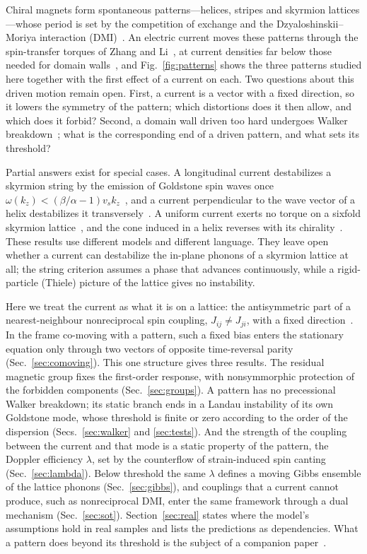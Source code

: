 \documentclass[prb,reprint,amsmath,amssymb,superscriptaddress,floatfix]{revtex4-2}
\begin{document}
Chiral magnets form spontaneous patterns---helices, stripes and skyrmion lattices---whose period is set by the competition of exchange and the Dzyaloshinskii--Moriya interaction (DMI)~\cite{Muhlbauer2009,Nagaosa2013}. An electric current moves these patterns through the spin-transfer torques of Zhang and Li~\cite{ZhangLi2004,Thiaville2005}, at current densities far below those needed for domain walls~\cite{Jonietz2010,Iwasaki2013}, and Fig.~\ref{fig:patterns} shows the three patterns studied here together with the first effect of a current on each. Two questions about this driven motion remain open. First, a current is a vector with a fixed direction, so it lowers the symmetry of the pattern; which distortions does it then allow, and which does it forbid? Second, a domain wall driven too hard undergoes Walker breakdown~\cite{SchryerWalker1974}; what is the corresponding end of a driven pattern, and what sets its threshold?

Partial answers exist for special cases. A longitudinal current destabilizes a skyrmion string by the emission of Goldstone spin waves once $\omega(k_z)<(\beta/\alpha-1)v_s k_z$~\cite{Okumura2023}, and a current perpendicular to the wave vector of a helix destabilizes it transversely~\cite{Masell2020}. A uniform current exerts no torque on a sixfold skyrmion lattice~\cite{Everschor2012}, and the cone induced in a helix reverses with its chirality~\cite{Jiang2020}. These results use different models and different language. They leave open whether a current can destabilize the in-plane phonons of a skyrmion lattice at all; the string criterion assumes a phase that advances continuously, while a rigid-particle (Thiele) picture of the lattice gives no instability.

Here we treat the current as what it is on a lattice: the antisymmetric part of a nearest-neighbour nonreciprocal spin coupling, $J_{ij}\neq J_{ji}$, with a fixed direction~\cite{Fruchart2021}. In the frame co-moving with a pattern, such a fixed bias enters the stationary equation only through two vectors of opposite time-reversal parity (Sec.~\ref{sec:comoving}). This one structure gives three results. The residual magnetic group fixes the first-order response, with nonsymmorphic protection of the forbidden components (Sec.~\ref{sec:groups}). A pattern has no precessional Walker breakdown; its static branch ends in a Landau instability of its own Goldstone mode, whose threshold is finite or zero according to the order of the dispersion (Secs.~\ref{sec:walker} and \ref{sec:tests}). And the strength of the coupling between the current and that mode is a static property of the pattern, the Doppler efficiency $\lambda$, set by the counterflow of strain-induced spin canting (Sec.~\ref{sec:lambda}). Below threshold the same $\lambda$ defines a moving Gibbs ensemble of the lattice phonons (Sec.~\ref{sec:gibbs}), and couplings that a current cannot produce, such as nonreciprocal DMI, enter the same framework through a dual mechanism (Sec.~\ref{sec:sot}). Section~\ref{sec:real} states where the model's assumptions hold in real samples and lists the predictions as dependencies. What a pattern does beyond its threshold is the subject of a companion paper~\cite{B2}.
\end{document}
